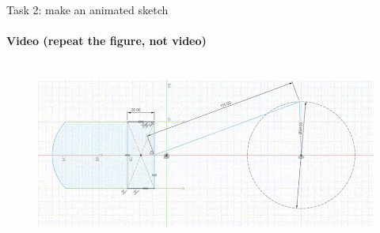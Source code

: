 \documentclass[aspectratio=169]{beamer}
\begin{document}
\begin{frame}[t]{Task 2: make an animated sketch}
    \framesubtitle{Video (repeat the figure, not video)}
    \vspace{-0.6cm}
    \begin{figure}[H]
        \href{https://youtu.be/KohY2-krw1I}{
            \centering\includegraphics[height=6cm,width=1\textwidth,keepaspectratio]{resources/task_2.png}}
        \label{fig:task_2.png}
    \end{figure}
\end{frame}
\end{document}
